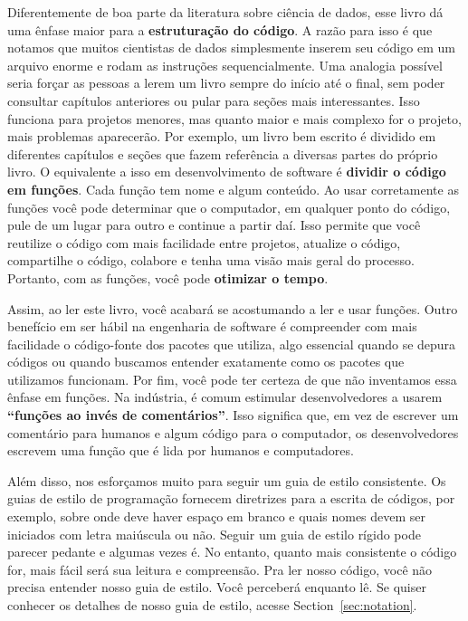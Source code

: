 \documentclass[
  notoc %
]{tufte-book}
\begin{document}
Diferentemente de boa parte da literatura sobre ciência de dados, esse
livro dá uma ênfase maior para a \textbf{estruturação do código}. A
razão para isso é que notamos que muitos cientistas de dados
simplesmente inserem seu código em um arquivo enorme e rodam as
instruções sequencialmente. Uma analogia possível seria forçar as
pessoas a lerem um livro sempre do início até o final, sem poder
consultar capítulos anteriores ou pular para seções mais interessantes.
Isso funciona para projetos menores, mas quanto maior e mais complexo
for o projeto, mais problemas aparecerão. Por exemplo, um livro bem
escrito é dividido em diferentes capítulos e seções que fazem referência
a diversas partes do próprio livro. O equivalente a isso em
desenvolvimento de software é \textbf{dividir o código em funções}. Cada
função tem nome e algum conteúdo. Ao usar corretamente as funções você
pode determinar que o computador, em qualquer ponto do código, pule de
um lugar para outro e continue a partir daí. Isso permite que você
reutilize o código com mais facilidade entre projetos, atualize o
código, compartilhe o código, colabore e tenha uma visão mais geral do
processo. Portanto, com as funções, você pode \textbf{otimizar o tempo}.

Assim, ao ler este livro, você acabará se acostumando a ler e usar
funções. Outro benefício em ser hábil na engenharia de software é
compreender com mais facilidade o código-fonte dos pacotes que utiliza,
algo essencial quando se depura códigos ou quando buscamos entender
exatamente como os pacotes que utilizamos funcionam. Por fim, você pode
ter certeza de que não inventamos essa ênfase em funções. Na indústria,
é comum estimular desenvolvedores a usarem \textbf{``funções ao invés de
comentários''}. Isso significa que, em vez de escrever um comentário
para humanos e algum código para o computador, os desenvolvedores
escrevem uma função que é lida por humanos e computadores.

Além disso, nos esforçamos muito para seguir um guia de estilo
consistente. Os guias de estilo de programação fornecem diretrizes para
a escrita de códigos, por exemplo, sobre onde deve haver espaço em
branco e quais nomes devem ser iniciados com letra maiúscula ou não.
Seguir um guia de estilo rígido pode parecer pedante e algumas vezes é.
No entanto, quanto mais consistente o código for, mais fácil será sua
leitura e compreensão. Pra ler nosso código, você não precisa entender
nosso guia de estilo. Você perceberá enquanto lê. Se quiser conhecer os
detalhes de nosso guia de estilo, acesse Section~\ref{sec:notation}.
\end{document}
